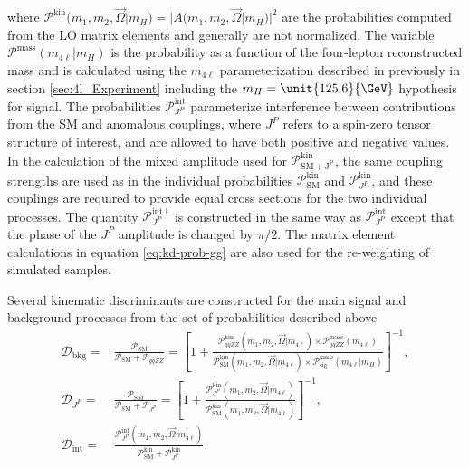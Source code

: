 where $\mathcal{P}^\text{kin}(m_1, m_2, \vec\Omega|m_{H}) = |{A}(m_1, m_2, \vec\Omega|m_{H})|^2$
are the probabilities computed from the LO matrix elements and generally are not normalized.
The variable $\mathcal{P}^\text{mass}(m_{4\ell}|m_{H})$ is the probability as a function of the four-lepton reconstructed mass
and is calculated using the $m_{4\ell}$ parameterization described in previously in section \ref{sec:4l_Experiment}
including the $m_{H}=\unit{125.6}{\GeV}$ hypothesis for signal.
The probabilities $\mathcal{P}_{J^P} ^\text{int}$ parameterize interference between contributions from the SM and
anomalous couplings, where $J^P$ refers to a spin-zero tensor structure of interest, and are allowed to have both positive
and negative values. In the calculation of the mixed amplitude used for $\mathcal{P}^\text{kin}_\mathrm{SM + J^P}$,
the same coupling strengths are used as in the individual probabilities $\mathcal{P}^\text{kin}_\mathrm{SM}$ and $\mathcal{P}^\text{kin}_{J^P}$,
and these couplings are required to provide equal cross sections for the two individual processes.
The quantity $\mathcal{P}_{J^P} ^{\text{int}\perp}$ is constructed in the same way
as $\mathcal{P}_{J^P} ^\text{int}$ except that the phase of the $J^P$ amplitude is changed by $\pi/2$.
The matrix element calculations in equation \eqref{eq:kd-prob-gg} are also used for the re-weighting of simulated samples.

Several kinematic discriminants are constructed for the main signal and background processes
from the set of probabilities described above
\begin{equation}\begin{aligned}
 \mathcal{D}_\text{bkg} =& \frac{\mathcal{P}_\mathrm{SM} }{\mathcal{P}_\mathrm{SM} +\mathcal{P}_{q\bar{q}ZZ} }=
\left[1+\frac{\mathcal{P}^\text{kin}_{q\bar{q}ZZ} (m_1, m_2, \vec\Omega | m_{4\ell})\times \mathcal{P}^\text{mass}_{q\bar{q}ZZ} (m_{4\ell})  }
{\mathcal{P}^\text{kin}_\mathrm{SM} (m_1, m_2, \vec\Omega | m_{4\ell}) \times \mathcal{P}^\text{mass}_\text{sig} (m_{4\ell}|m_{H}) } \right]^{-1} ,
 \\
\mathcal{D}_{J^P} =& \frac{\mathcal{P}_\mathrm{SM} }{\mathcal{P}_\mathrm{SM} + \mathcal{P}_{J^P} }=
\left[1+ \frac{\mathcal{P}^\text{kin}_{J^P} (m_1, m_2, \vec\Omega | m_{4\ell}) }
{\mathcal{P}^\text{kin}_\mathrm{SM} (m_1, m_2, \vec\Omega | m_{4\ell}) } \right]^{-1} ,
 \\
\mathcal{D}_\text{int} =& \frac{ \mathcal{P}_{J^P}^\text{int}(m_1, m_2, \vec\Omega | m_{4\ell})}
{\mathcal{P}^\text{kin}_\mathrm{SM} +\mathcal{P}^\text{kin}_{J^P} }  .
\end{aligned}\end{equation}

